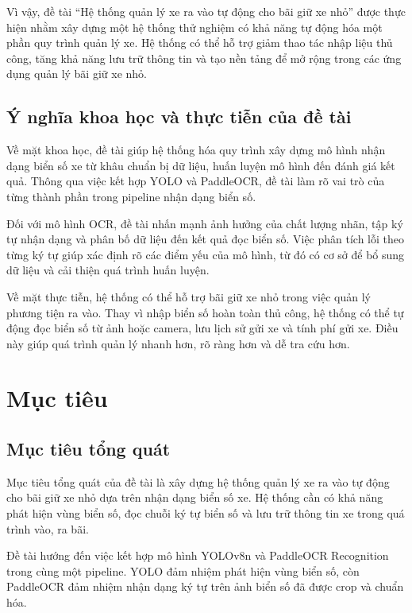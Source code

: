 \documentclass[13pt,a4paper]{report}
\begin{document}
Vì vậy, đề tài ``Hệ thống quản lý xe ra vào tự động cho bãi giữ xe nhỏ'' được thực hiện nhằm xây dựng một hệ thống thử nghiệm có khả năng tự động hóa một phần quy trình quản lý xe. Hệ thống có thể hỗ trợ giảm thao tác nhập liệu thủ công, tăng khả năng lưu trữ thông tin và tạo nền tảng để mở rộng trong các ứng dụng quản lý bãi giữ xe nhỏ.

\subsection{Ý nghĩa khoa học và thực tiễn của đề tài}

Về mặt khoa học, đề tài giúp hệ thống hóa quy trình xây dựng mô hình nhận dạng biển số xe từ khâu chuẩn bị dữ liệu, huấn luyện mô hình đến đánh giá kết quả. Thông qua việc kết hợp YOLO và PaddleOCR, đề tài làm rõ vai trò của từng thành phần trong pipeline nhận dạng biển số.

Đối với mô hình OCR, đề tài nhấn mạnh ảnh hưởng của chất lượng nhãn, tập ký tự nhận dạng và phân bố dữ liệu đến kết quả đọc biển số. Việc phân tích lỗi theo từng ký tự giúp xác định rõ các điểm yếu của mô hình, từ đó có cơ sở để bổ sung dữ liệu và cải thiện quá trình huấn luyện.

Về mặt thực tiễn, hệ thống có thể hỗ trợ bãi giữ xe nhỏ trong việc quản lý phương tiện ra vào. Thay vì nhập biển số hoàn toàn thủ công, hệ thống có thể tự động đọc biển số từ ảnh hoặc camera, lưu lịch sử gửi xe và tính phí gửi xe. Điều này giúp quá trình quản lý nhanh hơn, rõ ràng hơn và dễ tra cứu hơn.

\section{Mục tiêu}

\subsection{Mục tiêu tổng quát}

Mục tiêu tổng quát của đề tài là xây dựng hệ thống quản lý xe ra vào tự động cho bãi giữ xe nhỏ dựa trên nhận dạng biển số xe. Hệ thống cần có khả năng phát hiện vùng biển số, đọc chuỗi ký tự biển số và lưu trữ thông tin xe trong quá trình vào, ra bãi.

Đề tài hướng đến việc kết hợp mô hình YOLOv8n và PaddleOCR Recognition trong cùng một pipeline. YOLO đảm nhiệm phát hiện vùng biển số, còn PaddleOCR đảm nhiệm nhận dạng ký tự trên ảnh biển số đã được crop và chuẩn hóa.
\end{document}
